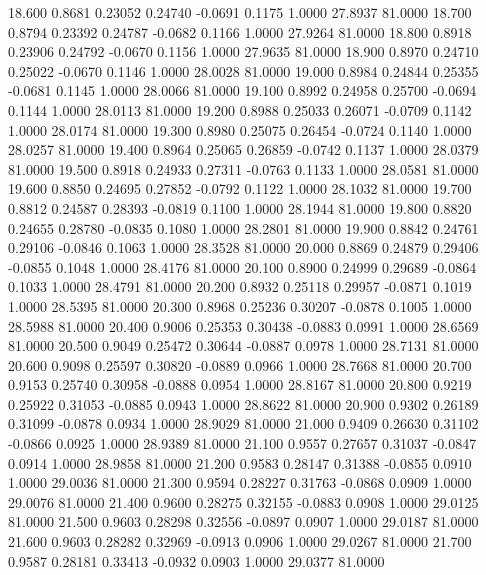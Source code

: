   18.600   0.8681   0.23052   0.24740  -0.0691   0.1175   1.0000  27.8937  81.0000
  18.700   0.8794   0.23392   0.24787  -0.0682   0.1166   1.0000  27.9264  81.0000
  18.800   0.8918   0.23906   0.24792  -0.0670   0.1156   1.0000  27.9635  81.0000
  18.900   0.8970   0.24710   0.25022  -0.0670   0.1146   1.0000  28.0028  81.0000
  19.000   0.8984   0.24844   0.25355  -0.0681   0.1145   1.0000  28.0066  81.0000
  19.100   0.8992   0.24958   0.25700  -0.0694   0.1144   1.0000  28.0113  81.0000
  19.200   0.8988   0.25033   0.26071  -0.0709   0.1142   1.0000  28.0174  81.0000
  19.300   0.8980   0.25075   0.26454  -0.0724   0.1140   1.0000  28.0257  81.0000
  19.400   0.8964   0.25065   0.26859  -0.0742   0.1137   1.0000  28.0379  81.0000
  19.500   0.8918   0.24933   0.27311  -0.0763   0.1133   1.0000  28.0581  81.0000
  19.600   0.8850   0.24695   0.27852  -0.0792   0.1122   1.0000  28.1032  81.0000
  19.700   0.8812   0.24587   0.28393  -0.0819   0.1100   1.0000  28.1944  81.0000
  19.800   0.8820   0.24655   0.28780  -0.0835   0.1080   1.0000  28.2801  81.0000
  19.900   0.8842   0.24761   0.29106  -0.0846   0.1063   1.0000  28.3528  81.0000
  20.000   0.8869   0.24879   0.29406  -0.0855   0.1048   1.0000  28.4176  81.0000
  20.100   0.8900   0.24999   0.29689  -0.0864   0.1033   1.0000  28.4791  81.0000
  20.200   0.8932   0.25118   0.29957  -0.0871   0.1019   1.0000  28.5395  81.0000
  20.300   0.8968   0.25236   0.30207  -0.0878   0.1005   1.0000  28.5988  81.0000
  20.400   0.9006   0.25353   0.30438  -0.0883   0.0991   1.0000  28.6569  81.0000
  20.500   0.9049   0.25472   0.30644  -0.0887   0.0978   1.0000  28.7131  81.0000
  20.600   0.9098   0.25597   0.30820  -0.0889   0.0966   1.0000  28.7668  81.0000
  20.700   0.9153   0.25740   0.30958  -0.0888   0.0954   1.0000  28.8167  81.0000
  20.800   0.9219   0.25922   0.31053  -0.0885   0.0943   1.0000  28.8622  81.0000
  20.900   0.9302   0.26189   0.31099  -0.0878   0.0934   1.0000  28.9029  81.0000
  21.000   0.9409   0.26630   0.31102  -0.0866   0.0925   1.0000  28.9389  81.0000
  21.100   0.9557   0.27657   0.31037  -0.0847   0.0914   1.0000  28.9858  81.0000
  21.200   0.9583   0.28147   0.31388  -0.0855   0.0910   1.0000  29.0036  81.0000
  21.300   0.9594   0.28227   0.31763  -0.0868   0.0909   1.0000  29.0076  81.0000
  21.400   0.9600   0.28275   0.32155  -0.0883   0.0908   1.0000  29.0125  81.0000
  21.500   0.9603   0.28298   0.32556  -0.0897   0.0907   1.0000  29.0187  81.0000
  21.600   0.9603   0.28282   0.32969  -0.0913   0.0906   1.0000  29.0267  81.0000
  21.700   0.9587   0.28181   0.33413  -0.0932   0.0903   1.0000  29.0377  81.0000
